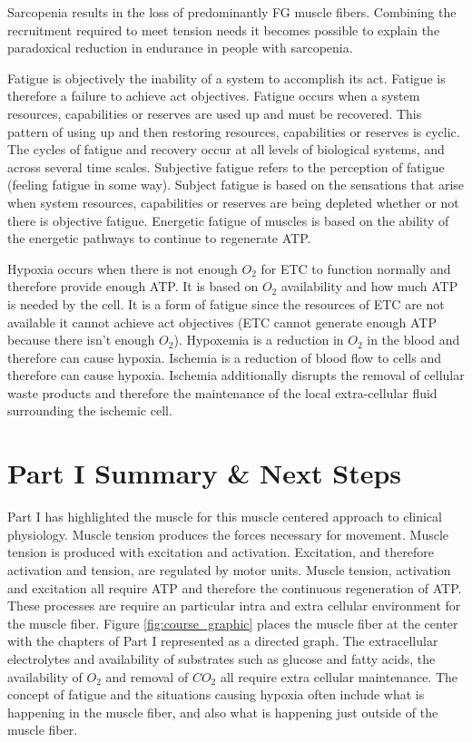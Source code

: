 Sarcopenia results in the loss of predominantly FG muscle fibers. Combining the recruitment required to meet tension needs it becomes possible to explain the paradoxical reduction in endurance in people with sarcopenia. 

Fatigue is objectively the inability of a system to accomplish its act. Fatigue is therefore a failure to achieve act objectives. Fatigue occurs when a system resources, capabilities or reserves are used up and must be recovered. This pattern of using up and then restoring resources, capabilities or reserves is cyclic. The cycles of fatigue and recovery occur at all levels of biological systems, and across several time scales. Subjective fatigue refers to the perception of fatigue (feeling fatigue in some way). Subject fatigue is based on the sensations that arise when system resources, capabilities or reserves are being depleted whether or not there is objective fatigue. Energetic fatigue of muscles is based on the ability of the energetic pathways to continue to regenerate ATP.

Hypoxia occurs when there is not enough $O_2$ for ETC to function normally and therefore provide enough ATP. It is based on $O_2$ availability and how much ATP is needed by the cell. It is a form of fatigue since the resources of ETC are not available it cannot achieve act objectives (ETC cannot generate enough ATP because there isn't enough $O_2$). Hypoxemia is a reduction in $O_2$ in the blood and therefore can cause hypoxia. Ischemia is a reduction of blood flow to cells and therefore can cause hypoxia. Ischemia additionally disrupts the removal of cellular waste products and therefore the maintenance of the local extra-cellular fluid surrounding the ischemic cell. 

\section{Part I Summary \& Next Steps}

Part I has highlighted the muscle for this muscle centered approach to clinical physiology. Muscle tension produces the forces necessary for movement. Muscle tension is produced with excitation and activation. Excitation, and therefore activation and tension, are regulated by motor units. Muscle tension, activation and excitation all require ATP and therefore the continuous regeneration of ATP. These processes are require an particular intra and extra cellular environment for the muscle fiber. Figure \ref{fig:course_graphic} places the muscle fiber at the center with the chapters of Part I represented as a directed graph. The extracellular electrolytes and availability of substrates such as glucose and fatty acids, the availability of $O_2$ and removal of $CO_2$ all require extra cellular maintenance. The concept of fatigue and the situations causing hypoxia often include what is happening in the muscle fiber, and also what is happening just outside of the muscle fiber. 


